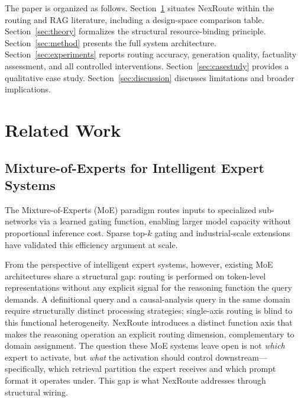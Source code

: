 \documentclass[a4paper,fleql,doubleblind]{cas-sc}
\begin{document}
The paper is organized as follows.
Section~\ref{sec:related} situates NexRoute within the routing and RAG literature,
including a design-space comparison table.
Section~\ref{sec:theory} formalizes the structural resource-binding principle.
Section~\ref{sec:method} presents the full system architecture.
Section~\ref{sec:experiments} reports routing accuracy, generation quality, factuality
assessment, and all controlled interventions.
Section~\ref{sec:casestudy} provides a qualitative case study.
Section~\ref{sec:discussion} discusses limitations and broader implications.



\section{Related Work}
\label{sec:related}

\subsection{Mixture-of-Experts for Intelligent Expert Systems}
The Mixture-of-Experts (MoE) paradigm \citep{shazeer2017outrageously} routes
inputs to specialized sub-networks via a learned gating function, enabling
larger model capacity without proportional inference cost.
Sparse top-$k$ gating and industrial-scale extensions~\citep{fedus2022switch,jiang2024mixtral,deepseekai2025deepseekv3}
have validated this efficiency argument at scale.

From the perspective of intelligent expert systems, however, existing MoE
architectures share a structural gap: routing is performed on token-level representations
without any explicit signal for the reasoning function the query demands.
A definitional query and a causal-analysis query in the same domain require
structurally distinct processing strategies; single-axis routing is blind to
this functional heterogeneity.
NexRoute introduces a distinct function axis that makes the reasoning operation
an explicit routing dimension, complementary to domain assignment.
The question these MoE systems leave open is not \emph{which} expert to activate,
but \emph{what} the activation should control downstream---specifically,
which retrieval partition the expert receives and which prompt format it operates under.
This gap is what NexRoute addresses through structural wiring.
\end{document}
